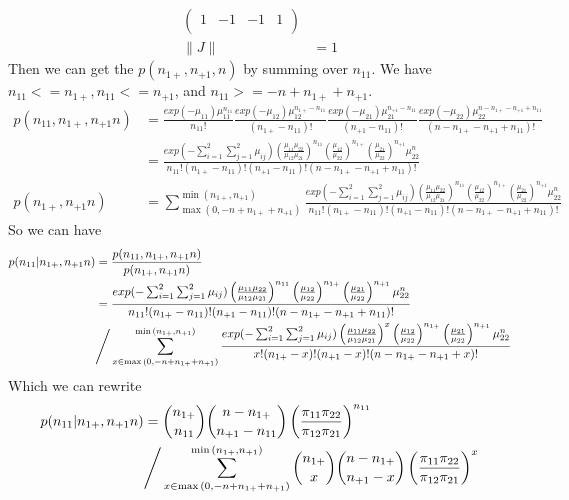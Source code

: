\documentclass[11pt]{article} %
\begin{document}
\begin{itemize}
\begin{align*}
\begin{pmatrix}
1 & -1 & -1 & 1\\
\end{pmatrix}\\
\lVert J \rVert &= 1
\end{align*}
Then we can get the $p(n_{1+}, n_{+1}, n)$ by summing over $n_{11}$. We have $n_{11} <= n_{1+}, n_{11} <= n_{+1}$, and $n_{11} >= -n + n_{1+} + n_{+1}$. 		
\begin{align*}
	p(n_{11}, n_{1+}, n_{+1} n) &= \frac{exp(-\mu_{11})\mu_{11}^{n_{11}} }{n_{11}!} \frac{exp(-\mu_{12})\mu_{12}^{n_{1+} - n_{11}}}{(n_{1+} - n_{11})!} \frac{exp(-\mu_{21})\mu_{21}^{n_{+1} - n_{11}}}{(n_{+1} - n_{11})!} \frac{exp(-\mu_{22})\mu_{22}^{n- n_{1+} - n_{+1} + n_{11}}}{(n- n_{1+} - n_{+1} + n_{11})!}\\
	&= \frac{exp(-\sum_{i=1}^2 \sum_{j=1}^2 \mu_{ij}) \left( \frac{\mu_{11} \mu_{22}}{\mu_{12} \mu_{21}}\right) ^{n_{11}} \left(\frac{\mu_{12}}{\mu_{22}} \right)^{n_{1+}} \left(\frac{\mu_{21}}{\mu_{22}} \right)^{n_{+1}} \mu_{22}^{n}} {n_{11}! (n_{1+} - n_{11})! (n_{+1} - n_{11})! (n- n_{1+} - n_{+1} + n_{11})!}\\
	p(n_{1+}, n_{+1} n) &= \sum_{ \max{(0, -n + n_{1+} + n_{+1})}}^{\min{(n_{1+}, n_{+1})}} \frac{exp(-\sum_{i=1}^2 \sum_{j=1}^2 \mu_{ij}) \left( \frac{\mu_{11} \mu_{22}}{\mu_{12} \mu_{21}}\right) ^{n_{11}} \left(\frac{\mu_{12}}{\mu_{22}} \right)^{n_{1+}} \left(\frac{\mu_{21}}{\mu_{22}} \right)^{n_{+1}} \mu_{22}^{n}} {n_{11}! (n_{1+} - n_{11})! (n_{+1} - n_{11})! (n- n_{1+} - n_{+1} + n_{11})!}
\end{align*}
So we can have 
\begin{align*}
	p(n_{11}|n_{1+}, n_{+1} n) &= \frac{p(n_{11}, n_{1+}, n_{+1} n)}{p(n_{1+}, n_{+1} n)}\\
	 &= \frac{exp(-\sum_{i=1}^2 \sum_{j=1}^2 \mu_{ij}) \left( \frac{\mu_{11} \mu_{22}}{\mu_{12} \mu_{21}}\right) ^{n_{11}} \left(\frac{\mu_{12}}{\mu_{22}} \right)^{n_{1+}} \left(\frac{\mu_{21}}{\mu_{22}} \right)^{n_{+1}} \mu_{22}^{n}} {n_{11}! (n_{1+} - n_{11})! (n_{+1} - n_{11})! (n- n_{1+} - n_{+1} + n_{11})!} \\
	 & \Bigg{/} \sum_{x \in \max{(0, -n + n_{1+} + n_{+1})}}^{\min{(n_{1+}, n_{+1})}} \frac{exp(-\sum_{i=1}^2 \sum_{j=1}^2 \mu_{ij}) \left( \frac{\mu_{11} \mu_{22}}{\mu_{12} \mu_{21}}\right) ^{x} \left(\frac{\mu_{12}}{\mu_{22}} \right)^{n_{1+}} \left(\frac{\mu_{21}}{\mu_{22}} \right)^{n_{+1}} \mu_{22}^{n}} {x! (n_{1+} - x)! (n_{+1} - x)! (n- n_{1+} - n_{+1} + x)!}
\end{align*}	
Which we can rewrite 
\begin{align*}
	p(n_{11}|n_{1+}, n_{+1} n) &= {n_{1+} \choose n_{11}} {n - n_{1+} \choose n_{+1}-n_{11}} \left( \frac{\pi_{11} \pi_{22}}{\pi_{12} \pi_{21}} \right)^{n_{11}}\\
	& \Bigg{/}  \sum_{x \in \max{(0, -n + n_{1+} + n_{+1})}}^{\min{(n_{1+}, n_{+1})}} {n_{1+} \choose x} {n - n_{1+} \choose n_{+1}-x} \left( \frac{\pi_{11} \pi_{22}}{\pi_{12} \pi_{21}}\right) ^x
\end{align*}


\end{itemize}
\end{document}
